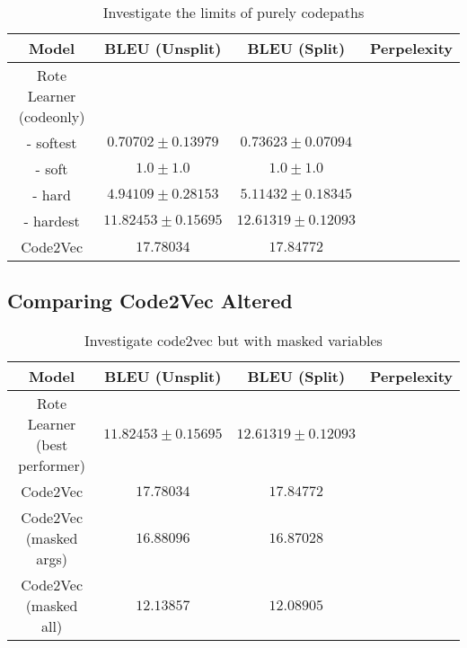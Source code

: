 
\begin{table}[h!]
\begin{center}
\begin{tabular}{ c | c | c | c }
    Model                             & BLEU (Unsplit)  & BLEU (Split)    & Perpelexity \\
    \hline
    Rote Learner (codeonly)           &  & & \\
    - softest                         & $ 0.70702 \pm  0.13979 $ & $ 0.73623 \pm 0.07094 $ &  \\
    - soft                            & $1.0 \pm 1.0 $  & $1.0 \pm 1.0 $  & \\
    - hard                             & $ 4.94109 \pm  0.28153 $ & $ 5.11432 \pm 0.18345 $ &\\
    - hardest                         & $ 11.82453 \pm  0.15695 $ & $ 12.61319 \pm 0.12093 $ & \\
    \hline
    Code2Vec                          & $ 17.78034 $ & $ 17.84772 $ & \\
    \hline
\end{tabular}
\caption {Investigate the limits of purely codepaths}
\label{table:name_code2vec_solo}
\end{center}
\end{table}


\subsection{Comparing Code2Vec Altered} %
\label{sub:comparing_code2vec_altered}


\begin{table}[h!]
\begin{center}
\begin{tabular}{ c | c | c | c }
    Model                             & BLEU (Unsplit)  & BLEU (Split)    & Perpelexity \\
    \hline
    Rote Learner (best performer)          & $ 11.82453 \pm  0.15695 $ & $ 12.61319 \pm 0.12093 $ & \\
    \hline
    Code2Vec                              & $ 17.78034 $ & $ 17.84772 $ & \\
    Code2Vec (masked args)                & $ 16.88096 $ & $ 16.87028 $ & \\
    Code2Vec (masked all)                 & $ 12.13857 $ & $ 12.08905 $ & \\
    \hline
\end{tabular}
\caption {Investigate code2vec but with masked variables}
\label{table:code_2_vec_masked}
\end{center}
\end{table}



